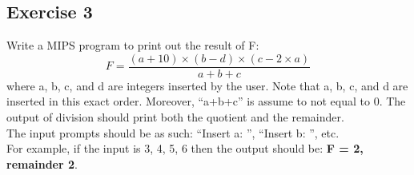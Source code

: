 \subsection{Exercise 3}
Write a MIPS program to print out the result of F:
\[
  F = \frac{(a+10)\times(b-d)\times(c-2\times a)}{a+b+c}
\]
where a, b, c, and d are integers inserted by the user. Note that a, b, c,
and d are inserted in this exact order. Moreover, ``a+b+c'' is assume to not
equal to 0. The output of division should print both the quotient and the
remainder.\\
The input prompts should be as such: ``Insert a: '', ``Insert b: '', etc.\\
For example, if the input is 3, 4, 5, 6 then the output should be: \textbf{F = 2,
remainder 2}.

